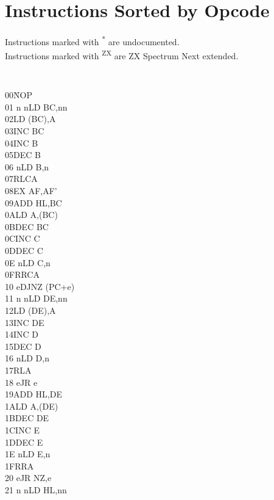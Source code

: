\documentclass[twoside,openright,a4paper]{book}
\begin{document}
\chapter{Instructions Sorted by Opcode}

Instructions marked with \textsuperscript{*} are undocumented.\\
Instructions marked with \textsuperscript{ZX} are ZX Spectrum Next extended.

\setlength\columnsep{2em}
\begin{multicols}{3}
{
	\tt 
	\small
	\begin{tabbing}
	00{\qquad}{\qquad}{\quad}\=NOP\\
	01 n n\>LD BC,nn\\
	02\>LD (BC),A\\
	03\>INC BC\\
	04\>INC B\\
	05\>DEC B\\
	06 n\>LD B,n\\
	07\>RLCA\\
	08\>EX AF,AF'\\
	09\>ADD HL,BC\\
	0A\>LD A,(BC)\\
	0B\>DEC BC\\
	0C\>INC C\\
	0D\>DEC C\\
	0E n\>LD C,n\\
	0F\>RRCA\\
	10 e\>DJNZ (PC+e)\\
	11 n n\>LD DE,nn\\
	12\>LD (DE),A\\
	13\>INC DE\\
	14\>INC D\\
	15\>DEC D\\
	16 n\>LD D,n\\
	17\>RLA\\
	18 e\>JR e\\
	19\>ADD HL,DE\\
	1A\>LD A,(DE)\\
	1B\>DEC DE\\
	1C\>INC E\\
	1D\>DEC E\\
	1E n\>LD E,n\\
	1F\>RRA\\
	20 e\>JR NZ,e\\
	21 n n\>LD HL,nn\\

\end{tabbing}}
\end{multicols}
\end{document}
